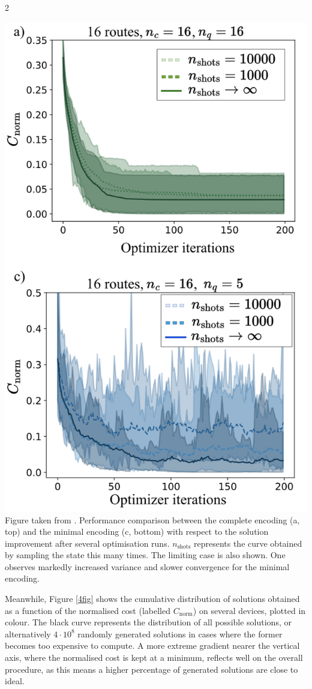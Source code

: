 \documentclass [10pt]{article}
\begin{document}
\begin {multicols}{2}
\begin {center}
\includegraphics [width=\linewidth]{2fig}
	{
	Figure taken from \cite{effvrp}. Performance comparison between the
	complete encoding (a, top) and the minimal encoding (c, bottom) with
	respect to the solution improvement after several optimisation runs.
	$n_{\text{shots}}$ represents the curve obtained by sampling the state
	this many times. The limiting case is also shown. One observes markedly
	increased variance and slower convergence for the minimal encoding.
}
\label {2fig}
\end {center}

Meanwhile, Figure \ref{4fig} shows the cumulative distribution of solutions
obtained as a function of the normalised cost (labelled $C_{\text{norm}}$) on
several devices, plotted in colour. The black curve represents the distribution
of all possible solutions, or alternatively $4 \cdot 10^8$ randomly generated
solutions in cases where the former becomes too expensive to compute. A more
extreme gradient nearer the vertical axis, where the normalised cost is kept
at a minimum, reflects well on the overall procedure, as this means a higher
percentage of generated solutions are close to ideal.


\end{multicols}
\end{document}
